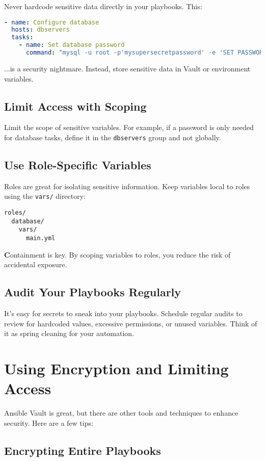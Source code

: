 Never hardcode sensitive data directly in your playbooks. This:
\begin{lstlisting}[language=yaml, caption=Don't Do This]
- name: Configure database
  hosts: dbservers
  tasks:
    - name: Set database password
      command: "mysql -u root -p'mysupersecretpassword' -e 'SET PASSWORD...'"
\end{lstlisting}

...is a security nightmare. Instead, store sensitive data in Vault or environment variables.

\subsection{Limit Access with Scoping}

Limit the scope of sensitive variables. For example, if a password is only needed for database tasks, define it in the \texttt{dbservers} group and not globally.

\subsection{Use Role-Specific Variables}

Roles are great for isolating sensitive information. Keep variables local to roles using the \texttt{vars/} directory:
\begin{verbatim}
roles/
  database/
    vars/
      main.yml
\end{verbatim}

\textbf{C}ontainment is key. By scoping variables to roles, you reduce the risk of accidental exposure.

\subsection{Audit Your Playbooks Regularly}

It's easy for secrets to sneak into your playbooks. Schedule regular audits to review for hardcoded values, excessive permissions, or unused variables. Think of it as spring cleaning for your automation.


\section{Using Encryption and Limiting Access}

Ansible Vault is great, but there are other tools and techniques to enhance security. Here are a few tips:

\subsection{Encrypting Entire Playbooks}


